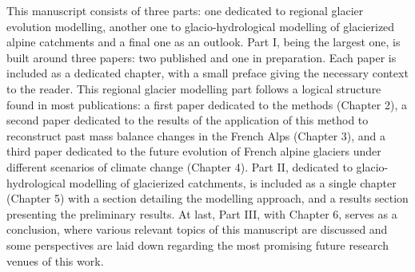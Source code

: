 This manuscript consists of three parts: one dedicated to regional glacier evolution modelling, another one to glacio-hydrological modelling of glacierized alpine catchments and a final one as an outlook. Part I, being the largest one, is built around three papers: two published and one in preparation. Each paper is included as a dedicated chapter, with a small preface giving the necessary context to the reader. This regional glacier modelling part follows a logical structure found in most publications: a first paper dedicated to the methods (Chapter 2), a second paper dedicated to the results of the application of this method to reconstruct past mass balance changes in the French Alps (Chapter 3), and a third paper dedicated to the future evolution of French alpine glaciers under different scenarios of climate change (Chapter 4). Part II, dedicated to glacio-hydrological modelling of glacierized catchments, is included as a single chapter (Chapter 5) with a section detailing the modelling approach, and a results section presenting the preliminary results. At last, Part III, with Chapter 6, serves as a conclusion, where various relevant topics of this manuscript are discussed and some perspectives are laid down regarding the most promising future research venues of this work.